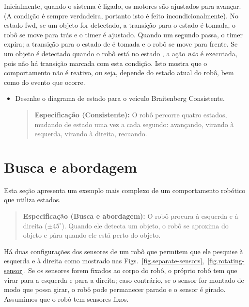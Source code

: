 Inicialmente, quando o sistema é ligado, os motores são ajustados para avançar. (A condição  é sempre verdadeira, portanto isto é feito incondicionalmente). No estado {fwd}, se um objeto for detectado,
 a transição para o estado  é tomada, o robô se move para trás e o timer é ajustado. Quando um segundo passa, o timer expira; a transição para o estado de  é tomada e o robô se move para frente. Se um objeto é detectado quando o robô está no estado , a ação \emph{não} é executada, pois não há transição marcada com esta condição. Isto mostra que o comportamento não é reativo, ou seja, depende do estado atual do robô, bem como do evento que ocorre.

\begin{framed}
\begin{itemize}
\item Desenhe o diagrama de estado para o veículo Braitenberg Consistente.
\begin{quote}
\normalsize\noindent\textbf{Especificação (Consistente):} O robô percorre quatro estados, mudando de estado uma vez a cada segundo: avançando, virando à esquerda, virando à direita, recuando.
\end{quote}
\end{itemize}
\end{framed}

\section{Busca e abordagem}\label{s.search-and-approach}

Esta seção apresenta um exemplo mais complexo de um comportamento robótico que utiliza estados.

\begin{quote}
\normalsize\noindent\textbf{Especificação (Busca e abordagem):} O robô procura à esquerda e à direita ($\pm 45^\circ$). Quando ele detecta um objeto, o robô se aproxima do objeto e pára quando ele está perto do objeto.
\end{quote}

Há duas configurações dos sensores de um robô que permitem que ele pesquise à esquerda e à direita como mostrado nas Figs.~\ref{fig.separate-sensors},~\ref{fig.rotating-sensor}. Se os sensores forem fixados ao corpo do robô, o próprio robô tem que virar para a esquerda e para a direita; caso contrário, se o sensor for montado de modo que possa girar, o robô pode permanecer parado e o sensor é girado. Assumimos que o robô tem sensores fixos.

